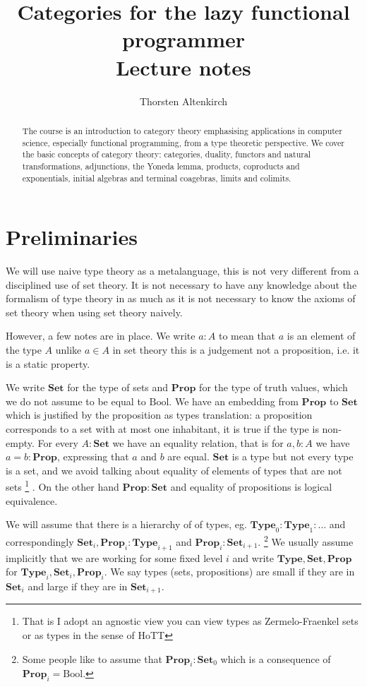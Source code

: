 \documentclass{article}
\title{Categories for the lazy functional programmer\\
Lecture notes}
\author{Thorsten Altenkirch}
\newcommand{\Type}{\mathbf{Type}}
\newcommand{\Prop}{\mathbf{Prop}}
\newcommand{\Set}{\mathbf{Set}}
\newcommand{\Bool}{\mathrm{Bool}}
\begin{document}
\maketitle

\begin{abstract}
  The course is an introduction to category theory emphasising applications in computer science, especially functional programming, from a type theoretic perspective. We cover the basic concepts of category theory: categories, duality, functors and natural transformations, adjunctions, the Yoneda lemma, products, coproducts and exponentials, initial algebras and terminal coagebras,  limits and colimits. %
\end{abstract}

\tableofcontents

\section{Preliminaries}
\label{sec:prelim}

We will use naive type theory as a metalanguage, this is not very different from a disciplined use of set theory. It is not necessary to have any knowledge about the formalism of type theory in as much as it is not necessary to know the axioms of set theory when using set theory naively.

However, a few notes are in place. We write $a : A$ to mean that $a$ is an element of the type $A$ unlike $a \in A$ in set theory this is a judgement not a proposition, i.e. it is a static property.

We write $\Set$ for the type of sets and $\Prop$ for the type of truth values, which we do not assume to be equal to  $\Bool$. We have an embedding from $\Prop$ to $\Set$ which is justified by the proposition as types translation: a proposition corresponds to a set with at most one inhabitant, it  is true if the type is non-empty. For every $A:\Set$ we have an equality relation, that is for $a,b : A$ we have $a = b : \Prop$, expressing that $a$ and $b$ are equal. $\Set$ is a type but not every type is a set, and we avoid talking about equality of elements of types that are not sets%
\footnote{That is I adopt an agnostic view you can view types as Zermelo-Fraenkel sets or as types in the sense of HoTT}%
. On the other hand $\Prop : \Set$ and equality of propositions is logical equivalence. 

We will assume that there is a hierarchy of of types, eg. $\Type_0 : \Type_1 : \dots$ and correspondingly $\Set_i,\Prop_i : \Type_{i+1}$ and $\Prop_i : \Set_{i+1}$.
\footnote{Some people like to assume that $\Prop_i : \Set_0$ which is a consequence of $\Prop_i = \Bool$.}
We usually assume implicitly that we are working for some fixed level $i$ and write $\Type,\Set,\Prop$ for $\Type_i,\Set_i,\Prop_i$. We say types (sets, propositions) are small if they are in $\Set_i$ and large if they are in $\Set_{i+1}$.
\end{document}
